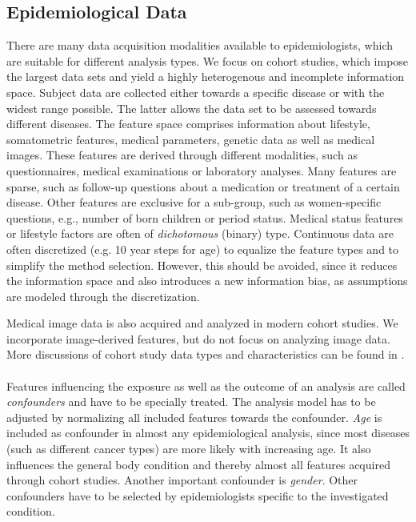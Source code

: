 \documentclass[journal]{style/vgtc} 			          %
\begin{document}
\subsection{Epidemiological Data} \label{sec:EpidemiologicalData}
There are many data acquisition modalities available to epidemiologists, which are suitable for different analysis types.
We focus on cohort studies, which impose the largest data sets and yield a highly heterogenous and incomplete information space.
Subject data are collected either towards a specific disease or with the widest range possible.
The latter allows the data set to be assessed towards different diseases.
The feature space comprises information about lifestyle, somatometric features, medical parameters, genetic data as well as medical images.
These features are derived through different modalities, such as questionnaires, medical examinations or laboratory analyses.
Many features are sparse, such as follow-up questions about a medication or treatment of a certain disease.
Other features are exclusive for a sub-group, such as women-specific questions, e.g., number of born children or period status.
Medical status features or lifestyle factors are often of \emph{dichotomous} (binary) type.
Continuous data are often discretized (e.g. 10 year steps for age) to equalize the feature types and to simplify the method selection.
However, this should be avoided, since it reduces the information space and also introduces a new information bias, as assumptions are modeled through the discretization.

Medical image data is also acquired and analyzed in modern cohort studies.
We incorporate image-derived features, but do not focus on analyzing image data.
More discussions of cohort study data types and characteristics can be found in \cite{Preim2014, Toennies2015}.
\\\\
Features influencing the exposure as well as the outcome of an analysis are called \emph{confounders} and have to be specially treated.
The analysis model has to be adjusted by normalizing all included features towards the confounder.
\emph{Age} is included as confounder in almost any epidemiological analysis, since most diseases (such as different cancer types) are more likely with increasing age.
It also influences the general body condition and thereby almost all features acquired through cohort studies.
Another important confounder is \emph{gender}.
Other confounders have to be selected by epidemiologists specific to the investigated condition.
\end{document}
